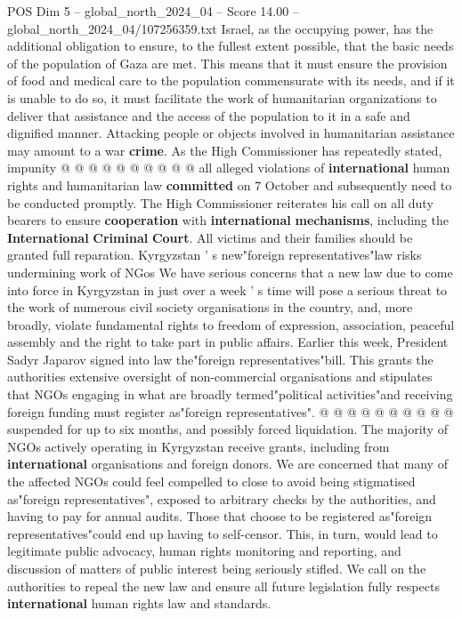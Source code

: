 \begin{textsample}{POS Dim 5 – global\_north\_2024\_04 – Score 14.00 – global\_north\_2024\_04/107256359.txt}
Israel, as the occupying power, has the additional obligation to ensure, to the fullest extent possible, that the basic needs of the population of Gaza are met.
This means that it must ensure the provision of food and medical care to the population commensurate with its needs, and if it is unable to do so, it must facilitate the work of humanitarian organizations to deliver that assistance and the access of the population to it in a safe and dignified manner.
Attacking people or objects involved in humanitarian assistance may amount to a war \textbf{crime}.
As the High Commissioner has repeatedly stated, impunity @ @ @ @ @ @ @ @ @ @ all alleged violations of \textbf{international} human rights and humanitarian law \textbf{committed} on 7 October and subsequently need to be conducted promptly.
The High Commissioner reiterates his call on all duty bearers to ensure \textbf{cooperation} with \textbf{international} \textbf{mechanisms}, including the \textbf{International} \textbf{Criminal} \textbf{Court}.
All victims and their families should be granted full reparation.
Kyrgyzstan ' s new"foreign representatives"law risks undermining work of NGos We have serious concerns that a new law due to come into force in Kyrgyzstan in just over a week ' s time will pose a serious threat to the work of numerous civil society organisations in the country, and, more broadly, violate fundamental rights to freedom of expression, association, peaceful assembly and the right to take part in public affairs.
Earlier this week, President Sadyr Japarov signed into law the"foreign representatives"bill.
This grants the authorities extensive oversight of non-commercial organisations and stipulates that NGOs engaging in what are broadly termed"political activities"and receiving foreign funding must register as"foreign representatives". @ @ @ @ @ @ @ @ @ @ suspended for up to six months, and possibly forced liquidation.
The majority of NGOs actively operating in Kyrgyzstan receive grants, including from \textbf{international} organisations and foreign donors.
We are concerned that many of the affected NGOs could feel compelled to close to avoid being stigmatised as"foreign representatives", exposed to arbitrary checks by the authorities, and having to pay for annual audits.
Those that choose to be registered as"foreign representatives"could end up having to self-censor.
This, in turn, would lead to legitimate public advocacy, human rights monitoring and reporting, and discussion of matters of public interest being seriously stifled.
We call on the authorities to repeal the new law and ensure all future legislation fully respects \textbf{international} human rights law and standards.

\end{textsample}
